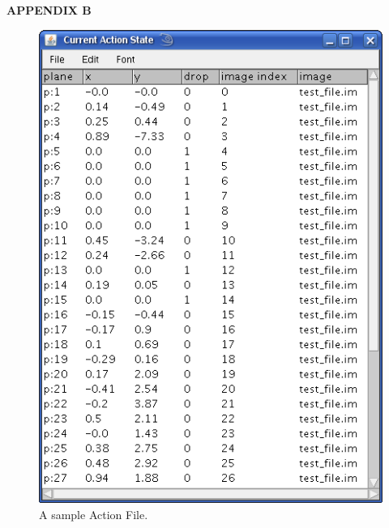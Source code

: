 \documentclass{article}
\begin{document}
\newpage
\begin{center}\LARGE{\textbf{APPENDIX B}}\end{center} 
\vfill
\begin{figure}[htp!]
\centering
\includegraphics[scale=0.75]{snapshot_ActionFile.png}
\caption{A sample Action File.}
\end{figure}
\vfill
\end{document}
